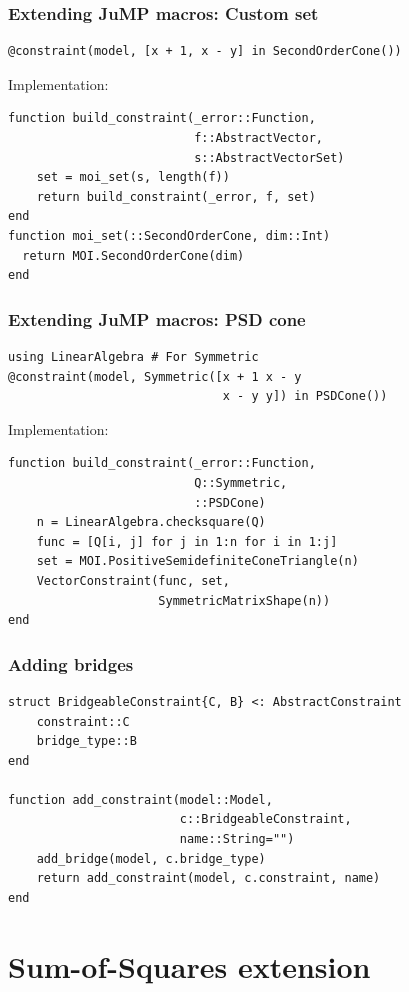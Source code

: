 \documentclass{beamer}
\begin{document}
\begin{frame}[fragile]
  \frametitle{Extending JuMP macros: Custom set}
\begin{verbatim}
@constraint(model, [x + 1, x - y] in SecondOrderCone())
\end{verbatim}
  Implementation:
\begin{verbatim}
function build_constraint(_error::Function,
                          f::AbstractVector,
                          s::AbstractVectorSet)
    set = moi_set(s, length(f))
    return build_constraint(_error, f, set)
end
function moi_set(::SecondOrderCone, dim::Int)
  return MOI.SecondOrderCone(dim)
end
\end{verbatim}
\end{frame}

\begin{frame}[fragile]
  \frametitle{Extending JuMP macros: PSD cone}
\begin{verbatim}
using LinearAlgebra # For Symmetric
@constraint(model, Symmetric([x + 1 x - y
                              x - y y]) in PSDCone())
\end{verbatim}
  Implementation:
\begin{verbatim}
function build_constraint(_error::Function,
                          Q::Symmetric,
                          ::PSDCone)
    n = LinearAlgebra.checksquare(Q)
    func = [Q[i, j] for j in 1:n for i in 1:j]
    set = MOI.PositiveSemidefiniteConeTriangle(n)
    VectorConstraint(func, set,
                     SymmetricMatrixShape(n))
end
\end{verbatim}
\end{frame}

\begin{frame}[fragile]
  \frametitle{Adding bridges}
\begin{verbatim}
struct BridgeableConstraint{C, B} <: AbstractConstraint
    constraint::C
    bridge_type::B
end

function add_constraint(model::Model,
                        c::BridgeableConstraint,
                        name::String="")
    add_bridge(model, c.bridge_type)
    return add_constraint(model, c.constraint, name)
end
\end{verbatim}
\end{frame}

\section{Sum-of-Squares extension}
\end{document}

